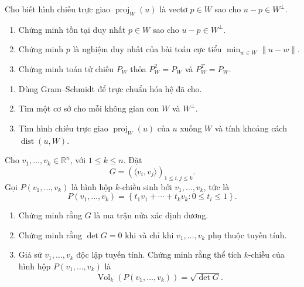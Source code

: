 ﻿\documentclass[12pt,a4paper]{article}
\DeclareMathOperator{\proj}{proj}
\DeclareMathOperator{\dist}{dist}
\begin{document}
\begin{problem}[6 điểm]


Cho biết hình chiếu trực giao $\proj_W(u)$ là vectơ $p\in W$ sao cho $u-p\in W^\perp$.

\begin{enumerate}[label=(\alph*)]
    \item Chứng minh tồn tại duy nhất $p\in W$ sao cho $u-p\in W^\perp$.
    \item Chứng minh $p$ là nghiệm duy nhất của bài toán cực tiểu $\min_{w\in W}\|u-w\|$.
    \item Chứng minh toán tử chiếu $P_W$ thỏa $P_W^2=P_W$ và $P_W^T=P_W$.
\end{enumerate}

\end{problem}
\begin{problem}[8 điểm]


\begin{enumerate}[label=(\alph*)]
    \item Dùng Gram--Schmidt để trực chuẩn hóa hệ đã cho.
    \item Tìm một cơ sở cho mỗi không gian con $W$ và $W^\perp$.
    \item Tìm hình chiếu trực giao $\proj_W(u)$ của $u$ xuống $W$ và tính khoảng cách $\dist(u,W)$.
\end{enumerate}

\end{problem}


\begin{problem}[5 điểm]
Cho \(v_1,\ldots,v_k\in \mathbb R^n\), với \(1\le k\le n\). Đặt
\[
G=(\langle v_i,v_j\rangle)_{1\le i,j\le k}.
\]
Gọi \(P(v_1,\ldots,v_k)\) là hình hộp \(k\)-chiều sinh bởi \(v_1,\ldots,v_k\), tức là
\[
P(v_1,\ldots,v_k)
=
\left\{
t_1v_1+\cdots+t_kv_k:
0\le t_i\le 1
\right\}.
\]

\begin{enumerate}[label=(\alph*)]
    \item Chứng minh rằng \(G\) là ma trận nửa xác định dương.

    \item Chứng minh rằng $
    \det G=0 $
    khi và chỉ khi \(v_1,\ldots,v_k\) phụ thuộc tuyến tính.

    \item Giả sử \(v_1,\ldots,v_k\) độc lập tuyến tính. Chứng minh rằng thể tích \(k\)-chiều của hình hộp \(P(v_1,\ldots,v_k)\) là
    \[
    \operatorname{Vol}_k(P(v_1,\ldots,v_k))
    =
    \sqrt{\det G}.
    \]

\end{enumerate}
\end{problem}
\end{document}
